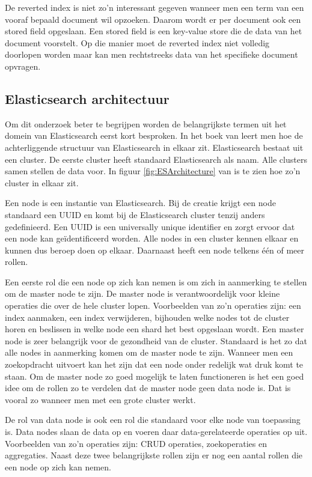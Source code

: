 De reverted index is niet zo'n interessant gegeven wanneer men een term van een vooraf bepaald document wil opzoeken. Daarom wordt er per document ook een stored field opgeslaan. Een stored field is een key-value store die de data van het document voorstelt. Op die manier moet de reverted index niet volledig doorlopen worden maar kan men rechtstreeks data van het specifieke document opvragen.

\subsection{Elasticsearch architectuur}
\label{architectuur}

Om dit onderzoek beter te begrijpen worden de belangrijkste termen uit het domein van Elasticsearch eerst kort besproken. In het boek van \textcite{Dixit2016} leert men hoe de achterliggende structuur van Elasticsearch in elkaar zit. Elasticsearch bestaat uit een cluster. De eerste cluster heeft standaard Elasticsearch als naam. Alle clusters samen stellen de data voor. In figuur \ref{fig:ESArchitecture} van \textcite{Babaev2013} is te zien hoe zo'n cluster in elkaar zit.

Een node is een instantie van Elasticsearch. Bij de creatie krijgt een node standaard een UUID en komt bij de Elasticsearch cluster tenzij anders gedefinieerd. Een UUID is een universally unique identifier en zorgt ervoor dat een node kan geïdentificeerd worden. Alle nodes in een cluster kennen elkaar en kunnen dus beroep doen op elkaar. Daarnaast heeft een node telkens één of meer rollen.

Een eerste rol die een node op zich kan nemen is om zich in aanmerking te stellen om de master node te zijn. De master node is verantwoordelijk voor kleine operaties die over de hele cluster lopen. Voorbeelden van zo’n operaties zijn: een index aanmaken, een index verwijderen, bijhouden welke nodes tot de cluster horen en beslissen in welke node een shard het best opgeslaan wordt. Een master node is zeer belangrijk voor de gezondheid van de cluster. Standaard is het zo dat alle nodes in aanmerking komen om de master node te zijn. Wanneer men een zoekopdracht uitvoert kan het zijn dat een node onder redelijk wat druk komt te staan. Om de master node zo goed mogelijk te laten functioneren is het een goed idee om de rollen zo te verdelen dat de master node geen data node is. Dat is vooral zo wanneer men met een grote cluster werkt.

De rol van data node is ook een rol die standaard voor elke node van toepassing is. Data nodes slaan de data op en voeren daar data-gerelateerde operaties op uit. Voorbeelden van zo’n operaties zijn: CRUD operaties, zoekoperaties en aggregaties. Naast deze twee belangrijkste rollen zijn er nog een aantal rollen die een node op zich kan nemen.

